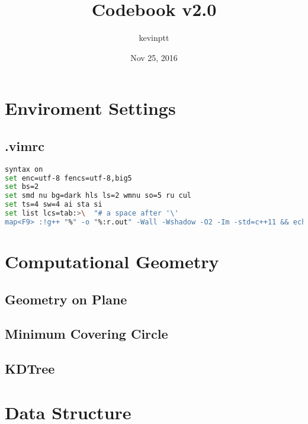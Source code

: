 \documentclass[11pt,twocolumn,a4paper]{article}
\title{Codebook v2.0}
\author{kevinptt}
\date{Nov 25, 2016}
\begin{document}
\setlength{\headheight}{30pt}
\pagestyle{fancy}
\fancyhead[R]{\thepage}
\fancyfoot{}
\renewcommand{\contentsname}{Index}
\tableofcontents


\newpage
\section{Enviroment Settings}
\subsection{.vimrc}
\begin{lstlisting}[label=.vimrc,language=bash]
syntax on
set enc=utf-8 fencs=utf-8,big5
set bs=2
set smd nu bg=dark hls ls=2 wmnu so=5 ru cul
set ts=4 sw=4 ai sta si
set list lcs=tab:>\  "# a space after '\'
map<F9> :!g++ "%" -o "%:r.out" -Wall -Wshadow -O2 -Im -std=c++11 && echo "===== done =====" && "./%:r.out"
\end{lstlisting}


\newpage
\section{Computational Geometry}

\subsection{Geometry on Plane}


\subsection{Minimum Covering Circle}


\subsection{KDTree}



\newpage
\section{Data Structure}
\end{document}
